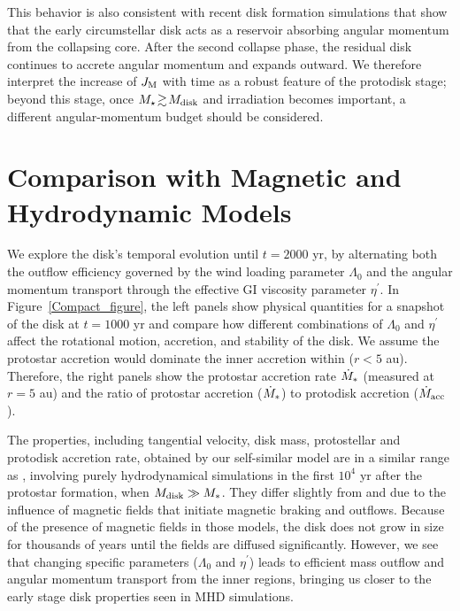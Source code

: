 \documentclass[twocolumn,linenumbers]{aastex631}
\begin{document}
This behavior is also consistent with recent disk formation simulations \citep[e.g.,][]{tsukamoto2022fragmentation}
that show that the early circumstellar disk acts as a reservoir absorbing angular momentum from the collapsing core.
After the second collapse phase, the residual disk continues to accrete angular momentum and expands outward. We therefore interpret the increase of $J_{\rm M}$ with time as a robust feature of the protodisk stage; beyond this stage, once $M_\star\!\gtrsim\!M_{\rm disk}$ and irradiation becomes important, a different angular-momentum budget should be considered.

\section{Comparison with Magnetic and Hydrodynamic Models}\label{Simul}

We explore the disk's temporal evolution until $t = 2000$ yr, by alternating both the outflow efficiency governed by the wind loading parameter $\Lambda_0$ and the angular momentum transport through the effective GI viscosity parameter $\eta^{\prime}$. In Figure~\ref{Compact_figure}, the left panels show physical quantities for a snapshot of the disk at $t = 1000$ yr and compare how different combinations of $\Lambda_0$ and $\eta^{\prime}$ affect the rotational motion, accretion, and stability of the disk. We assume the protostar accretion would dominate the inner accretion within ($r < 5$ au). Therefore, the right panels show 
the protostar accretion rate $\dot{M}_{\rm *}$ (measured at $r = 5$ au) and the ratio of protostar accretion  ($\dot{M}_{\rm *}$) to protodisk accretion ($\dot{M}_{\rm acc}$).

The properties, including tangential velocity, disk mass, protostellar and protodisk accretion rate,  obtained by our self-similar model are in a similar range as \cite{machida2010formation}, involving purely
hydrodynamical simulations in the first $10^4$ yr after the protostar formation, when $M_{\rm disk} \gg M_*$. They differ slightly from \cite{machida2011effect} and \cite{machida2019first} due to the influence of magnetic fields that initiate magnetic braking and outflows. Because of the presence of magnetic fields in those models, the disk does not grow in size for thousands of years until the fields are diffused significantly. However, we see that changing specific parameters ($\Lambda_0$ and $\eta^{\prime}$) leads to efficient mass outflow and angular momentum transport from the inner regions, bringing us closer to the early stage disk properties seen in MHD simulations.
\end{document}
